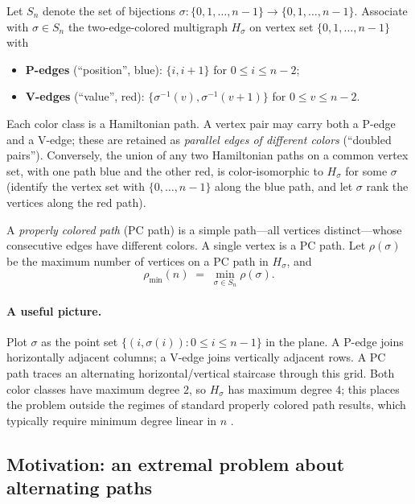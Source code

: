 \documentclass[11pt]{article}
\theoremstyle{definition}
\newcommand{\pmin}{\rho_{\min}}
\newcommand{\inv}[1]{#1^{-1}}
\begin{document}
Let $S_n$ denote the set of bijections
$\sigma\colon \{0,1,\dots,n-1\}\to\{0,1,\dots,n-1\}$.
Associate with $\sigma \in S_n$ the two-edge-colored multigraph $H_\sigma$ on vertex
set $\{0,1,\dots,n-1\}$ with
\begin{itemize}
\item \textbf{P-edges} (``position'', blue): $\{i, i+1\}$ for $0 \le i \le n-2$;
\item \textbf{V-edges} (``value'', red): $\{\inv\sigma(v), \inv\sigma(v+1)\}$ for
$0 \le v \le n-2$.
\end{itemize}
Each color class is a Hamiltonian path. A vertex pair may carry both a P-edge and a
V-edge; these are retained as \emph{parallel edges of different colors} (``doubled
pairs''). Conversely, the union of any two Hamiltonian paths on a common vertex set,
with one path blue and the other red, is color-isomorphic to $H_\sigma$ for some
$\sigma$ (identify the vertex set with $\{0,\dots,n-1\}$ along the blue path, and let
$\sigma$ rank the vertices along the red path).

A \emph{properly colored path} (PC path) is a simple path---all vertices
distinct---whose consecutive edges have different colors. A single vertex is a PC
path. Let $\rho(\sigma)$ be the maximum number of vertices on a PC path in $H_\sigma$,
and
\[
\pmin(n) \;=\; \min_{\sigma\in S_n} \rho(\sigma) .
\]

\paragraph{A useful picture.} Plot $\sigma$ as the point set
$\{(i,\sigma(i)) : 0\le i\le n-1\}$ in the plane. A P-edge joins horizontally adjacent
columns; a V-edge joins vertically adjacent rows. A PC path traces an alternating
horizontal/vertical staircase through this grid. Both color classes have maximum
degree $2$, so $H_\sigma$ has maximum degree $4$; this places the problem outside the
regimes of standard properly colored path results, which typically require minimum
degree linear in $n$ \cite{ABMMM10}.

\subsection{Motivation: an extremal problem about alternating paths}\label{subsec:motiv}
\end{document}
